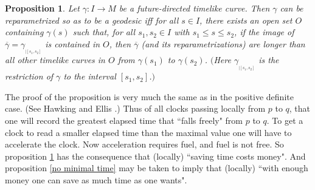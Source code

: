 \documentclass [12] {article}
\theoremstyle{plain}
\newtheorem{proposition}{Proposition}[subsection]
\numberwithin{figure}{subsection}
\numberwithin{proposition}{subsection}
\begin{document}
\begin{proposition} \label{local maximal time} 
Let $\gamma : I \rightarrow M$  be a future-directed timelike curve.  Then $\gamma$ can be reparametrized so as to be a geodesic iff for all $s \in I$, there exists an open set $O$ containing $\gamma(s)$ such that, for all $s_1, s_2 \in I$ with $s_1 \le s \le s_2$, if the image of $\overline{\gamma} = \gamma _{_{| [s_1, s_2]}}$ is contained in  $O$, then $\overline{\gamma}$ (and its reparametrizations) are longer than all other timelike curves in $O$ from $\gamma(s_1)$ to $\gamma(s_2)$.  $($Here  $\gamma _{_{| [s_1, s_2]}}$   is the restriction of $\gamma$ to the interval  $ [s_1, s_2]$.$)$
\end{proposition}
%
%
The proof of the proposition is very much the same as in the positive definite case. (See Hawking and Ellis .) Thus of all clocks passing locally from $p$ to $q$, that one will record the greatest elapsed time that ``falls freely" from $p$ to $q$. To get a clock to read a smaller elapsed time than the maximal value one will have to accelerate the clock.  Now acceleration requires fuel, and fuel is not free. So proposition \ref{local maximal time} has the consequence that (locally) ``saving time costs money". And  proposition \ref{no minimal time} may be taken to imply that (locally) ``with enough money one can save as much time as one wants".

\end{document}
